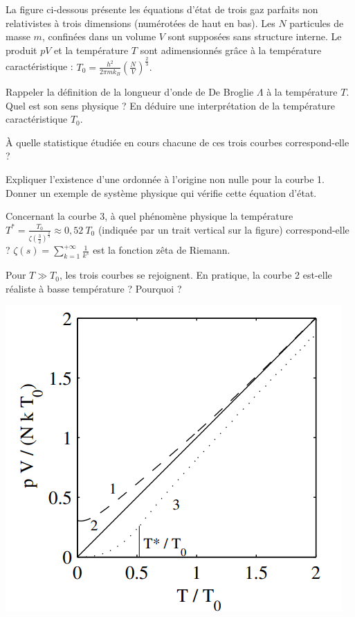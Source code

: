 La figure ci-dessous présente les équations d'état de trois gaz parfaits non relativistes à trois
dimensions (numérotées de haut en bas). Les $N$ particules de masse $m$, confinées dans un volume $V$ sont supposées sans
structure interne. Le produit $pV$ et la température $T$ sont adimensionnés grâce à la température
caractéristique : $T_0=\frac{h^2}{2\pi m k_B} \left( \frac{N}{V} \right)^{\frac{2}{3}}.$



\question
Rappeler la définition de la longueur d'onde de De Broglie $\Lambda$ à la température $T$.
Quel est son sens physique ? En déduire une interprétation de la température caractéristique $T_0$.

\question \`A quelle statistique étudiée en cours chacune de ces trois courbes correspond-elle ?

\question Expliquer l'existence d’une ordonnée à l’origine non nulle pour la courbe 1. Donner un exemple de système physique qui vérifie cette équation d'état.

\question
Concernant la courbe 3, à quel phénomène physique
la température $T^*=\frac{T_0}{\zeta(\frac{3}{2})^{\frac{2}{3}}} \approx  0,52 \ T_0$ (indiquée par un trait vertical sur la figure) correspond-elle ? $\zeta(s)=\sum_{k=1}^{+\infty} \frac{1}{k^s}$ est la fonction zêta de Riemann. 

\question Pour $T \gg T_0$, les trois courbes se rejoignent. En pratique, la courbe 2 est-elle réaliste à basse température ? Pourquoi ?

\begin{center}
\includegraphics[scale=0.4]{../Fig/TroisStatistiques}
\end{center}
